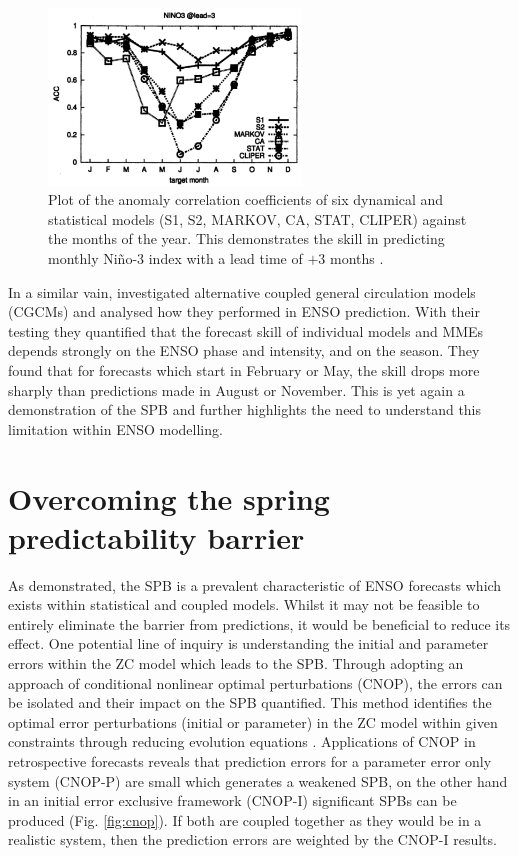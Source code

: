 \documentclass[12pt, onecolumn]{revtex4}    %
\begin{document}
\begin{figure}
\includegraphics[width=0.6\textwidth]{data/ecmwf_data}
\caption[Persistence]{Plot of the anomaly correlation coefficients of six dynamical and statistical models (S1, S2, MARKOV, CA, STAT, CLIPER) against the months of the year. This demonstrates the skill in predicting monthly Ni\~{n}o-3 index with a lead time of $+3$ months \citep{jan2005did}.}
\label{fig:ecmwf_plot}
\end{figure}

In a similar vain, \cite{jin2008current} investigated alternative coupled general circulation models (CGCMs) and analysed how they performed in ENSO prediction. With their testing they quantified that the forecast skill of individual models and MMEs depends strongly on the ENSO phase and intensity, and on the season. They found that for forecasts which start in February or May, the skill drops more sharply than predictions made in August or November. This is yet again a demonstration of the SPB and further highlights the need to understand this limitation within ENSO modelling.

\section{Overcoming the spring predictability barrier}

As demonstrated, the SPB is a prevalent characteristic of ENSO forecasts which exists within statistical and coupled models. Whilst it may not be feasible to entirely eliminate the barrier from predictions, it would be beneficial to reduce its effect. One potential line of inquiry is understanding the initial and parameter errors within the ZC model which leads to the SPB. Through adopting an approach of conditional nonlinear optimal perturbations (CNOP), the errors can be isolated and their impact on the SPB quantified. This method identifies the optimal error perturbations (initial or parameter) in the ZC model within given constraints through reducing evolution equations \citep{mu2010extension}. Applications of CNOP in retrospective forecasts reveals that prediction errors for a parameter error only system (CNOP-P) are small which generates a weakened SPB, on the other hand in an initial error exclusive framework (CNOP-I) significant SPBs can be produced (Fig. \ref{fig:cnop}). If both are coupled together as they would be in a realistic system, then the prediction errors are weighted by the CNOP-I results. \\
\end{document}
